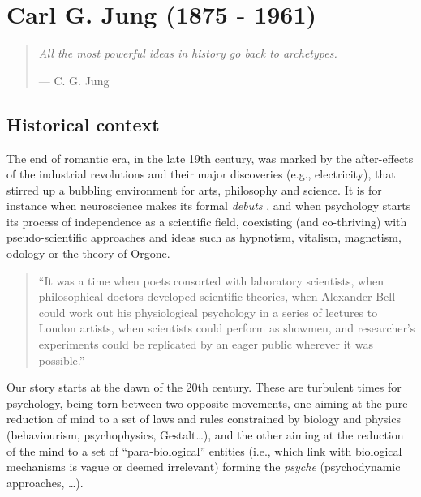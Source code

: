 \documentclass[
]{book}
\begin{document}
\hypertarget{carl-g.-jung-1875---1961}{%
\section{Carl G. Jung (1875 - 1961)}\label{carl-g.-jung-1875---1961}}

\begin{quote}
\emph{All the most powerful ideas in history go back to archetypes.}

\hfill --- C. G. Jung
\end{quote}

\hypertarget{historical-context}{%
\subsection{Historical context}\label{historical-context}}

The end of romantic era, in the late 19th century, was marked by the after-effects of the industrial revolutions and their major discoveries (e.g., electricity), that stirred up a bubbling environment for arts, philosophy and science. It is for instance when neuroscience makes its formal \emph{debuts} \citep[even though the term ``neuroscience'' would appear only a century later, in the 1960s;][]{rose20155o}, and when psychology starts its process of independence as a scientific field, coexisting (and co-thriving) with pseudo-scientific approaches and ideas such as hypnotism, vitalism, magnetism, odology or the theory of Orgone.

\begin{quote}
``It was a time when poets consorted with laboratory scientists,
when philosophical doctors developed scientific theories,
when Alexander Bell could work out his physiological psychology in a series of lectures to London artists,
when scientists could perform as showmen,
and researcher's experiments could be replicated by an eager public wherever it was possible.'' \citep{richardson2001british}
\end{quote}

Our story starts at the dawn of the 20th century. These are turbulent times for psychology, being torn between two opposite movements, one aiming at the pure reduction of mind to a set of laws and rules constrained by biology and physics (behaviourism, psychophysics, Gestalt\ldots), and the other aiming at the reduction of the mind to a set of ``para-biological'' entities (i.e., which link with biological mechanisms is vague or deemed irrelevant) forming the \emph{psyche} (psychodynamic approaches, \ldots).
\end{document}
